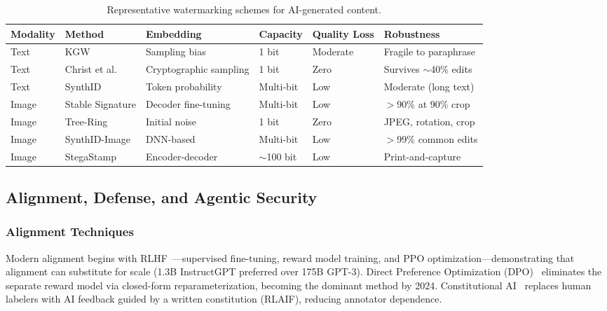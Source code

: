 \begin{table}[htbp]
\centering
\caption{Representative watermarking schemes for AI-generated content.}
\label{tab:watermark}
\small
\begin{tabular}{p{1.2cm}p{2.2cm}p{2.0cm}p{1.5cm}p{1.5cm}p{3.5cm}}
\toprule
\textbf{Modality} & \textbf{Method} & \textbf{Embedding} & \textbf{Capacity} & \textbf{Quality Loss} & \textbf{Robustness} \\
\midrule
Text & KGW & Sampling bias & 1 bit & Moderate & Fragile to paraphrase \\
\addlinespace
Text & Christ et al. & Cryptographic sampling & 1 bit & Zero & Survives $\sim$40\% edits \\
\addlinespace
Text & SynthID & Token probability & Multi-bit & Low & Moderate (long text) \\
\addlinespace
Image & Stable Signature & Decoder fine-tuning & Multi-bit & Low & $>$90\% at 90\% crop \\
\addlinespace
Image & Tree-Ring & Initial noise & 1 bit & Zero & JPEG, rotation, crop \\
\addlinespace
Image & SynthID-Image & DNN-based & Multi-bit & Low & $>$99\% common edits \\
\addlinespace
Image & StegaStamp & Encoder-decoder & $\sim$100 bit & Low & Print-and-capture \\
\bottomrule
\end{tabular}
\end{table}


\subsection{Alignment, Defense, and Agentic Security}
\label{sec:alignment}

\subsubsection{Alignment Techniques}
\label{sec:alignment-tech}

Modern alignment begins with RLHF~\cite{ouyang2022rlhf}---supervised fine-tuning, reward model training, and PPO optimization---demonstrating that alignment can substitute for scale (1.3B InstructGPT preferred over 175B GPT-3). Direct Preference Optimization (DPO)~\cite{rafailov2023dpo} eliminates the separate reward model via closed-form reparameterization, becoming the dominant method by 2024. Constitutional AI~\cite{bai2022constitutionalai} replaces human labelers with AI feedback guided by a written constitution (RLAIF), reducing annotator dependence.


